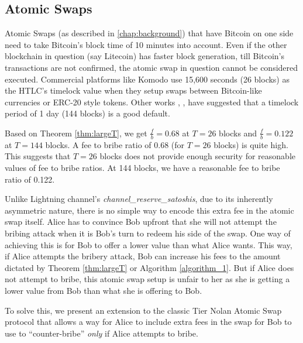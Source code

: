 \subsection{Atomic Swaps}
Atomic Swaps (as described in \ref{chap:background}) that have Bitcoin on one side need to take Bitcoin's block time of 10 minutes into account. Even if the other blockchain in question (say Litecoin) has faster block generation, till Bitcoin's transactions are not confirmed, the atomic swap in question cannot be considered executed. Commercial platforms like Komodo \cite{komodo} use 15,600 seconds (26 blocks) as the HTLC's timelock value when they setup swaps between Bitcoin-like currencies or ERC-20 style tokens. Other works \cite{atomic_swaps_american_call_options}, \cite{atomic_swaps_bitmex}, \cite{htlcs_considered_harmful} have suggested that a timelock period of 1 day (144 blocks) is a good default. 

Based on Theorem \ref{thm:largeT}, we get $\frac{f}{b} = 0.68$ at $T = 26$ blocks and $\frac{f}{b} = 0.122$ at $T = 144$ blocks. A fee to bribe ratio of 0.68 (for $T = 26$ blocks) is quite high. This suggests that $T = 26$ blocks does not provide enough security for reasonable values of fee to bribe ratios. At 144 blocks, we have a reasonable fee to bribe ratio of 0.122. 

Unlike Lightning channel's \emph{channel\_reserve\_satoshis}, due to its inherently asymmetric nature, there is no simple way to encode this extra fee in the atomic swap itself. Alice has to convince Bob upfront that she will not attempt the bribing attack when it is Bob's turn to redeem his side of the swap. One way of achieving this is for Bob to offer a lower value than what Alice wants. This way, if Alice attempts the bribery attack, Bob can increase his \sellertxn{} fees to the amount dictated by Theorem \ref{thm:largeT} or Algorithm \ref{algorithm_1}. But if Alice does not attempt to bribe, this atomic swap setup is unfair to her as she is getting a lower value from Bob than what she is offering to Bob.

To solve this, we present an extension to the classic Tier Nolan Atomic Swap protocol that allows a way for Alice to include extra fees in the swap for Bob to use to ``counter-bribe'' \textit{only} if Alice attempts to bribe.

